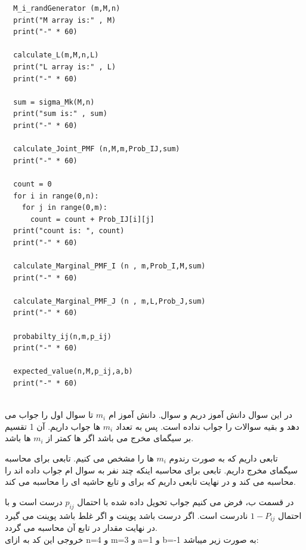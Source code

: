 \documentclass[a4paper,14pt]{article}
\begin{document}
\begin{latin}
\begin{lstlisting}
  M_i_randGenerator (m,M,n)
  print("M array is:" , M)
  print("-" * 60)

  calculate_L(m,M,n,L)
  print("L array is:" , L)
  print("-" * 60)

  sum = sigma_Mk(M,n)
  print("sum is:" , sum)
  print("-" * 60)

  calculate_Joint_PMF (n,M,m,Prob_IJ,sum)
  print("-" * 60)

  count = 0
  for i in range(0,n):
    for j in range(0,m):
      count = count + Prob_IJ[i][j]
  print("count is: ", count)
  print("-" * 60)

  calculate_Marginal_PMF_I (n , m,Prob_I,M,sum)
  print("-" * 60)

  calculate_Marginal_PMF_J (n , m,L,Prob_J,sum)
  print("-" * 60)

  probabilty_ij(n,m,p_ij)
  print("-" * 60)

  expected_value(n,M,p_ij,a,b)
  print("-" * 60)
		
	\end{lstlisting}
\end{latin}
\fontsize{14}{14}\selectfont 


در این سوال  دانش آموز دریم و  سوال. دانش آموز  ام $m_i$ تا سوال اول را جواب می دهد و بقیه سوالات را جواب نداده است. پس به تعداد $m_i$ ها جواب داریم.  آن 1 تقسیم بر سیگمای مخرج می باشد اگر 	ها کمتر از $m_i$ ها باشد.

\noindent تابعی داریم که به صورت رندوم  $m_i$ ها را مشخص می کنیم. تابعی برای محاسبه سیگمای مخرج داریم. تابعی برای محاسبه اینکه چند نفر به سوال  ام جواب داده اند را محاسبه می کند و در نهایت تابعی داریم که برای  و  تابع  حاشیه ای را محاسبه می کند.

\noindent در قسمت ب، فرض می کنیم جواب تحویل داده شده با احتمال $p_{ij}$ درست است و با احتمال $ 1 - P_{ij} $ نادرست است. اگر درست باشد  پوینت و اگر غلط باشد  پوینت می گیرد در نهایت مقدار  در تابع آن محاسبه می گردد.\\

خروجی این کد به ازای n=4 و m=3 و a=1 و b=-1 به صورت زیر میباشد:\\
\end{document}
